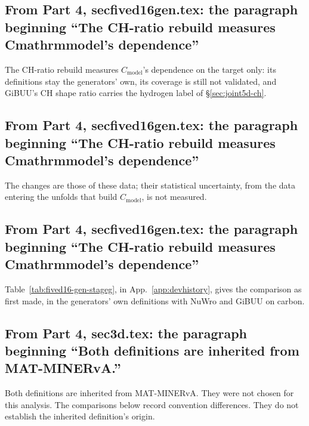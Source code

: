 \subsection{From Part 4, secfived16gen.tex: the paragraph beginning ``The CH-ratio rebuild measures Cmathrmmodel's dependence''}
The CH-ratio rebuild measures $C_{\mathrm{model}}$'s dependence on the target only: its definitions stay the generators' own, its coverage is still not validated, and GiBUU's CH shape ratio carries the hydrogen label of \S\ref{sec:joint5d-ch}.

\subsection{From Part 4, secfived16gen.tex: the paragraph beginning ``The CH-ratio rebuild measures Cmathrmmodel's dependence''}
The changes are those of these data; their statistical uncertainty, from the data entering the unfolds that build $C_{\mathrm{model}}$, is not measured.

\subsection{From Part 4, secfived16gen.tex: the paragraph beginning ``The CH-ratio rebuild measures Cmathrmmodel's dependence''}
Table~\ref{tab:fived16-gen-stageg}, in App.~\ref{app:devhistory}, gives the comparison as first made, in the generators' own definitions with NuWro and GiBUU on carbon.

\subsection{From Part 4, sec3d.tex: the paragraph beginning ``Both definitions are inherited from MAT-MINERvA.''}
Both definitions are inherited from MAT-MINERvA. They were not chosen for this analysis. The comparisons below record convention differences. They do not establish the inherited definition's origin.

